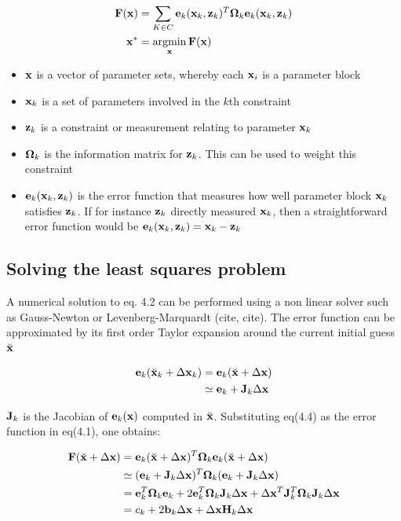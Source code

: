  \begin{align}
   \bv{F}(\bv x) &= \sum\limits_{K \in C}^{} 
                 \bv e_k(\bv x_k, \bv z_k)^T 
                 \bv \Omega_k
                 \bv e_k(\bv x_k, \bv z_k)  \\ 
   \bv x^* &= \operatornamewithlimits{argmin}\limits_{\bv x}\bv{F}(\bv x)
 \end{align}

\begin{itemize}
 \item $\mathbf x$ is a vector of parameter sets, whereby each $\mathbf x_i$ is a parameter block
 \item $\mathbf x_k$ is a set of parameters involved in the $k$th constraint
 \item $\mathbf z_k$ is a constraint or measurement relating to parameter $\mathbf x_k$
 \item $\mathbf \Omega_k$ is the information matrix for $\mathbf z_k$.  This can be used to weight this constraint
 \item $\mathbf e_k(\mathbf x_k, \mathbf z_k)$ is the error function that measures how well parameter block $\mathbf x_k$ satisfies $\mathbf z_k$.  If for instance $\mathbf z_k$ directly measured $\mathbf x_k$, then a straightforward error function would be $\mathbf e_k(\mathbf x_k, \mathbf z_k) = \mathbf x_k - \mathbf z_k $
\end{itemize}

\subsection{Solving the least squares problem}

A numerical solution to eq. 4.2 can be performed using a non linear solver such as Gauss-Newton or Levenberg-Marquardt (cite, cite).  The error function can be approximated by its first order Taylor expansion around the current initial guess $\breve{\mathbf x}$

\begin{align}
  \mathbf e_k(\breve{\mathbf x}_k + \Delta \mathbf x_k) &= \mathbf e_k(\breve{\mathbf x} + \Delta \mathbf x) \\
      & \simeq \mathbf e_k + \mathbf J_k \Delta \mathbf x
\end{align}

$\mathbf J_k$ is the Jacobian of $\mathbf e_k(\mathbf x)$ computed in $\breve{\mathbf x}$.  Substituting eq(4.4) as the error function in eq(4.1), one obtains:

\begin{align}
  \mathbf F(\breve{\mathbf x} + \Delta \mathbf x) &= \mathbf e_k(\breve{\mathbf x} + \Delta \mathbf x)^T \mathbf \Omega_k \mathbf e_k(\breve{\mathbf x} + \Delta \mathbf x) \\
  & \simeq (\mathbf e_k + \mathbf J_k \Delta \mathbf x)^T 
    \mathbf \Omega_k 
    (\mathbf e_k + \mathbf J_k \Delta \mathbf x) \\
  &= \mathbf e_k^T \mathbf \Omega_k \mathbf e_k 
    + 2 \mathbf e_k^T \mathbf \Omega_k \mathbf J_k \Delta \mathbf x 
    + \Delta \mathbf x^T \mathbf J_k^T \mathbf \Omega_k \mathbf J_k \Delta \mathbf x \\
  &= c_k + 2\mathbf b_k \Delta \mathbf x + \Delta \mathbf x \mathbf H_k \Delta \mathbf x
\end{align}


